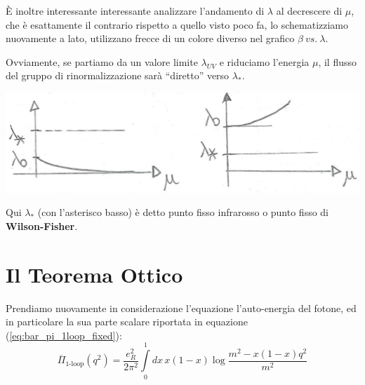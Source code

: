 \documentclass[../main.tex]{subfiles}
\begin{document}
\begin{itemize}
    È inoltre interessante interessante analizzare l'andamento di $\lambda$ al decrescere di $\mu$, che è esattamente il contrario rispetto a quello visto poco fa, lo schematizziamo nuovamente a lato, utilizzano frecce di un colore diverso nel grafico \(\beta ~ vs.~ \lambda\).

    Ovviamente, se partiamo da un valore limite \(\lambda_{UV}\) e riduciamo l'energia $\mu$, il flusso del gruppo di rinormalizzazione sarà “diretto” verso $\lambda_\ast$.
    
    \includegraphics[]{images_ch5/ir_lambdavsmu.jpg}

    Qui $\lambda_\ast$ (con l'asterisco basso) è detto punto fisso infrarosso o punto fisso di \textbf{Wilson-Fisher}.
\end{itemize}

\section{Il Teorema Ottico}
\label{sec:opt_theorem}
Prendiamo nuovamente in considerazione l'equazione l'auto-energia del fotone, ed in particolare la sua parte scalare riportata in equazione (\ref{eq:bar_pi_1loop_fixed}): 
\[
\overline\Pi_\text{1-loop}(q^2) = \frac{e_R^2}{2\pi^2}\int\limits_0^1 dx \,x(1-x)\log{\frac{m^2- x(1-x)q^2}{m^2}}
\]
\end{document}
